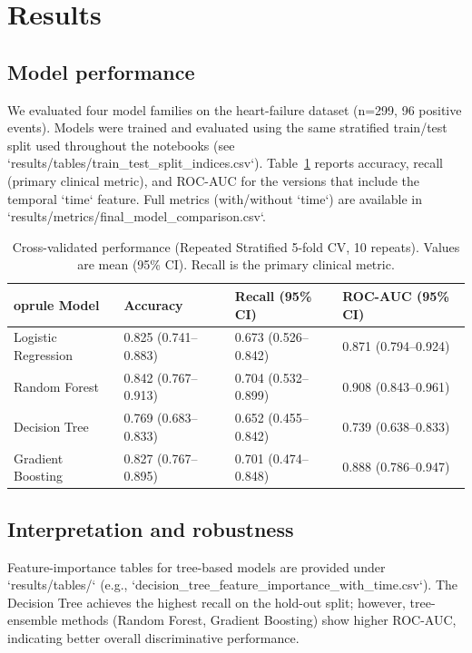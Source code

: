 \section{Results}
\label{sec:results}

\subsection{Model performance}
We evaluated four model families on the heart-failure dataset (n=299, 96 positive events). Models were trained and evaluated using the same stratified train/test split used throughout the notebooks (see `results/tables/train_test_split_indices.csv`). Table~\ref{tab:main_results} reports accuracy, recall (primary clinical metric), and ROC-AUC for the versions that include the temporal `time` feature. Full metrics (with/without `time`) are available in `results/metrics/final_model_comparison.csv`.

\begin{table}[ht]
  \centering
	\caption{Cross-validated performance (Repeated Stratified 5-fold CV, 10 repeats). Values are mean (95\% CI). Recall is the primary clinical metric.}
  \label{tab:main_results}
	\begin{tabular}{l l l l}
    	oprule
		Model & Accuracy & Recall (95\% CI) & ROC-AUC (95\% CI) \\
    \midrule
		Logistic Regression & 0.825 (0.741--0.883) & 0.673 (0.526--0.842) & 0.871 (0.794--0.924) \\
		Random Forest & 0.842 (0.767--0.913) & 0.704 (0.532--0.899) & 0.908 (0.843--0.961) \\
		Decision Tree & 0.769 (0.683--0.833) & 0.652 (0.455--0.842) & 0.739 (0.638--0.833) \\
		Gradient Boosting & 0.827 (0.767--0.895) & 0.701 (0.474--0.848) & 0.888 (0.786--0.947) \\
    \bottomrule
  \end{tabular}
\end{table}

\subsection{Interpretation and robustness}
Feature-importance tables for tree-based models are provided under `results/tables/` (e.g., `decision_tree_feature_importance_with_time.csv`). The Decision Tree achieves the highest recall on the hold-out split; however, tree-ensemble methods (Random Forest, Gradient Boosting) show higher ROC-AUC, indicating better overall discriminative performance.

